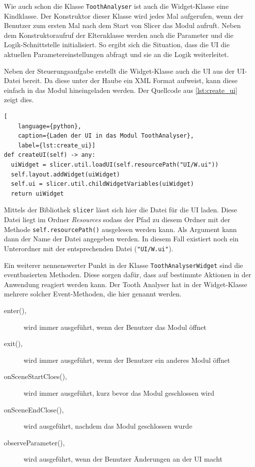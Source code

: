Wie auch schon die Klasse \texttt{ToothAnalyser} ist auch die Widget-Klasse eine
Kindklasse. Der Konstruktor dieser Klasse wird jedes Mal aufgerufen, wenn der
Benutzer zum ersten Mal nach dem Start von Slicer das Modul aufruft. Neben dem Konstruktoraufruf
der Elternklasse werden auch die Parameter und die Logik-Schnittstelle initialisiert.
So ergibt sich die Situation, dass die \ac{UI} die aktuellen
Parametereinstellungen abfragt und sie an die Logik weiterleitet.

Neben der Steuerungsaufgabe erstellt die Widget-Klasse auch die \ac{UI} aus der \ac{UI}-Datei
bereit. Da diese unter der Haube ein \ac{XML} Format aufweist, kann diese einfach
in das Modul hineingeladen werden. Der Quellcode aus \ref{lst:create_ui} zeigt
dies.

\begin{lstlisting}[
    language={python},
    caption={Laden der UI in das Modul ToothAnalyser},
    label={lst:create_ui}]
def createUI(self) -> any:
  uiWidget = slicer.util.loadUI(self.resourcePath("UI/W.ui"))
  self.layout.addWidget(uiWidget)
  self.ui = slicer.util.childWidgetVariables(uiWidget)
  return uiWidget
\end{lstlisting}

Mittels der Bibliothek \texttt{slicer} lässt sich hier die Datei für die \ac{UI}
laden. Diese Datei liegt im Ordner \textit{Resources} sodass der Pfad zu diesem Ordner
mit der Methode \texttt{self.resourcePath()} ausgelesen werden kann. Als Argument
kann dann der Name der Datei angegeben werden. In diesem Fall existiert noch ein
Unterordner mit der entsprechenden Datei (\texttt{"UI/W.ui"}).

Ein weiterer nennenswerter Punkt in der Klasse \texttt{ToothAnalyserWidget} sind
die eventbasierten Methoden. Diese sorgen dafür, dass auf bestimmte Aktionen in
der Anwendung reagiert werden kann. Der Tooth Analyser hat in der Widget-Klasse mehrere
solcher Event-Methoden, die hier genannt werden.

\begin{description}
	\item[enter(),] wird immer ausgeführt, wenn der Benutzer das Modul öffnet

	\item[exit(),] wird immer ausgeführt, wenn der Benutzer ein anderes Modul
		öffnet

	\item[onSceneStartCloes(),] wird immer ausgeführt, kurz bevor das Modul
		geschlossen wird

	\item[onSceneEndClose(),] wird ausgeführt, nachdem das Modul geschlossen wurde

	\item[observeParameter(),] wird ausgeführt, wenn der Benutzer Änderungen an
		der \ac{UI} macht
\end{description}

